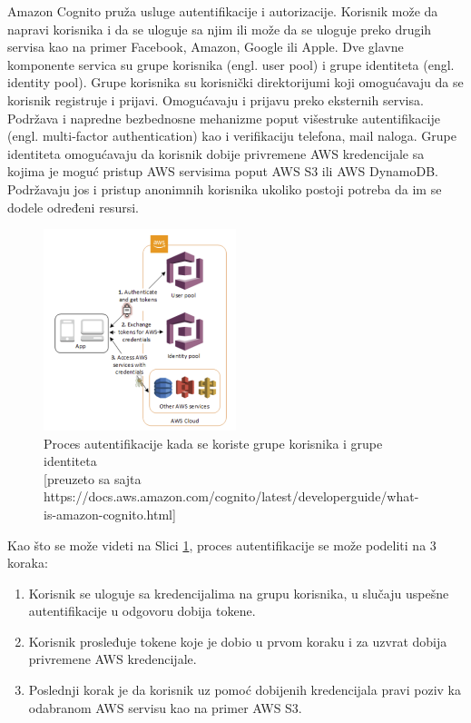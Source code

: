 \documentclass[12pt,oneside]{memoir}
\begin{document}
Amazon Cognito pruža usluge autentifikacije i autorizacije. Korisnik može da napravi korisnika i da se uloguje sa njim ili može da se uloguje preko drugih servisa kao na primer Facebook, Amazon, Google ili Apple. Dve glavne komponente servica su grupe korisnika (engl. user pool) i grupe identiteta (engl. identity pool). Grupe korisnika su korisnički direktorijumi koji omogućavaju da se korisnik registruje i prijavi. Omogućavaju i prijavu preko eksternih servisa. Podržava i napredne bezbednosne mehanizme poput višestruke autentifikacije (engl. multi-factor authentication) kao i verifikaciju telefona, mail naloga. Grupe identiteta omogućavaju da korisnik dobije privremene AWS kredencijale sa kojima je moguć pristup AWS servisima poput AWS S3 ili AWS DynamoDB. Podržavaju jos i pristup anonimnih korisnika ukoliko postoji potreba da im se dodele određeni resursi.


\begin{figure}[!ht]
  \centering
  \includegraphics[width=0.5\textwidth]{ProcesAutentifikacije.png}
  \caption{Proces autentifikacije kada se koriste grupe korisnika i grupe identiteta\\\footnotesize[preuzeto sa sajta https://docs.aws.amazon.com/cognito/latest/developerguide/what-is-amazon-cognito.html]}
  \label{fig:procesAutentifikacije}
\end{figure}

Kao što se može videti na Slici \ref{fig:procesAutentifikacije}, proces autentifikacije se može podeliti na 3 koraka:
\begin{enumerate}
  \item Korisnik se uloguje sa kredencijalima na grupu korisnika, u slučaju uspešne autentifikacije u odgovoru dobija tokene.
  \item Korisnik prosleđuje tokene koje je dobio u prvom koraku i za uzvrat dobija privremene AWS kredencijale.
  \item Poslednji korak je da korisnik uz pomoć dobijenih kredencijala pravi poziv ka odabranom AWS servisu kao na primer AWS S3.
\end{enumerate}
\end{document}
